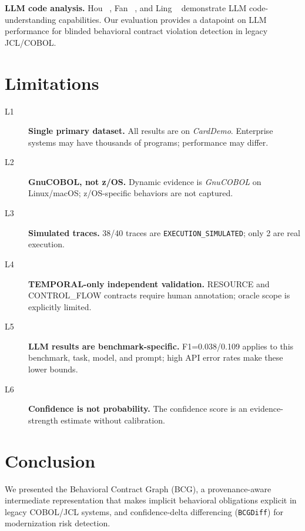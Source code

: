 \documentclass[sigconf,anonymous,review]{acmart}
\newcommand{\bcg}{\textsc{BCG}\xspace}
\newcommand{\carddemo}{\textit{CardDemo}\xspace}
\newcommand{\gnucobol}{\textit{GnuCOBOL}\xspace}
\begin{document}
\textbf{LLM code analysis.}
Hou \etal~\cite{hou2024llm4se}, Fan \etal~\cite{fan2023llm}, and Ling \etal~\cite{ling2023domain}
demonstrate LLM code-understanding capabilities.
Our evaluation provides a datapoint on LLM performance for blinded behavioral
contract violation detection in legacy JCL/COBOL.

\section{Limitations}\label{sec:limitations}

\begin{description}
\item[L1] \textbf{Single primary dataset.} All results are on \carddemo.
  Enterprise systems may have thousands of programs; performance may differ.
\item[L2] \textbf{GnuCOBOL, not z/OS.} Dynamic evidence is \gnucobol on
  Linux/macOS; z/OS-specific behaviors are not captured.
\item[L3] \textbf{Simulated traces.} 38/40 traces are \texttt{EXECUTION\_SIMULATED};
  only 2 are real execution.
\item[L4] \textbf{TEMPORAL-only independent validation.} RESOURCE and CONTROL\_FLOW
  contracts require human annotation; oracle scope is explicitly limited.
\item[L5] \textbf{LLM results are benchmark-specific.}
  F1=0.038/0.109 applies to this benchmark, task, model, and prompt; high API error
  rates make these lower bounds.
\item[L6] \textbf{Confidence is not probability.} The confidence score is an
  evidence-strength estimate without calibration.
\end{description}

\section{Conclusion}\label{sec:conclusion}

We presented the Behavioral Contract Graph (\bcg), a provenance-aware intermediate
representation that makes implicit behavioral obligations explicit in legacy
COBOL/JCL systems, and confidence-delta differencing (\texttt{BCGDiff}) for
modernization risk detection.
\end{document}
